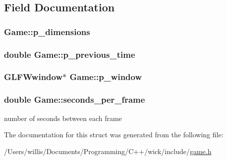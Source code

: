 \subsection{Field Documentation}
\hypertarget{struct_game_ad2cabdb62958fcfcc9ad5cc1f992d6e7}{
\subsubsection[{p\-\_\-dimensions}]{ Game\-::p\-\_\-dimensions}}\label{struct_game_ad2cabdb62958fcfcc9ad5cc1f992d6e7}
\hypertarget{struct_game_ac9e04dfeff5f2a4e721a96f44a5ccf5c}{
\subsubsection[{p\-\_\-previous\-\_\-time}]{\setlength{\rightskip}{0pt plus 5cm}double Game\-::p\-\_\-previous\-\_\-time}}\label{struct_game_ac9e04dfeff5f2a4e721a96f44a5ccf5c}
\hypertarget{struct_game_a0bb3ad6267419b3e64cf8a7b103b4a78}{
\subsubsection[{p\-\_\-window}]{\setlength{\rightskip}{0pt plus 5cm}G\-L\-F\-Wwindow$\ast$ Game\-::p\-\_\-window}}\label{struct_game_a0bb3ad6267419b3e64cf8a7b103b4a78}
\hypertarget{struct_game_ae20dfb2ebd31b51cb832c700c7ae5796}{
\subsubsection[{seconds\-\_\-per\-\_\-frame}]{\setlength{\rightskip}{0pt plus 5cm}double Game\-::seconds\-\_\-per\-\_\-frame}}\label{struct_game_ae20dfb2ebd31b51cb832c700c7ae5796}
number of seconds between each frame 

The documentation for this struct was generated from the following file\-:\begin{DoxyCompactItemize}
\item 
/\-Users/willis/\-Documents/\-Programming/\-C++/wick/include/\hyperlink{game_8h}{game.\-h}\end{DoxyCompactItemize}
